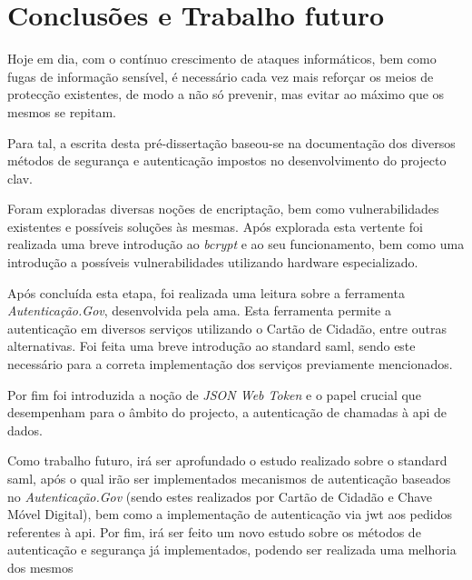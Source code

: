 \chapter{Conclusões e Trabalho futuro}

Hoje em dia, com o contínuo crescimento de ataques informáticos, bem como fugas de informação sensível, é necessário cada vez mais reforçar os meios de protecção existentes, de modo a não só prevenir, mas evitar ao máximo que os mesmos se repitam.

Para tal, a escrita desta pré-dissertação baseou-se na documentação dos diversos métodos de segurança e autenticação impostos no desenvolvimento do projecto \gls{clav}.

Foram exploradas diversas noções de encriptação, bem como vulnerabilidades existentes e possíveis soluções às mesmas. Após explorada esta vertente foi realizada uma breve introdução ao \emph{bcrypt} e ao seu funcionamento, bem como uma introdução a possíveis vulnerabilidades utilizando hardware especializado.

Após concluída esta etapa, foi realizada uma leitura sobre a ferramenta \emph{Autenticação.Gov}, desenvolvida pela \gls{ama}. Esta ferramenta permite a autenticação em diversos serviços utilizando o Cartão de Cidadão, entre outras alternativas. Foi feita uma breve introdução ao standard \gls{saml}, sendo este necessário para a correta implementação dos serviços previamente mencionados.

Por fim foi introduzida a noção de \emph{JSON Web Token} e o papel crucial que desempenham para o âmbito do projecto, a autenticação de chamadas à \gls{api} de dados.

Como trabalho futuro, irá ser aprofundado o estudo realizado sobre o standard \gls{saml}, após o qual irão ser implementados mecanismos de autenticação baseados no \emph{Autenticação.Gov} (sendo estes realizados por Cartão de Cidadão e Chave Móvel Digital), bem como a implementação de autenticação via \gls{jwt} aos pedidos referentes à \gls{api}. Por fim, irá ser feito um novo estudo sobre os métodos de autenticação e segurança já implementados, podendo ser realizada uma melhoria dos mesmos